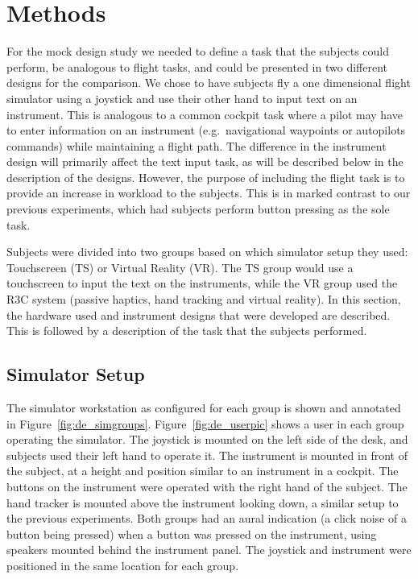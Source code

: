 \section{Methods}

For the mock design study we needed to define a task that the subjects could perform, be analogous to flight tasks, and could be presented in two different designs for the comparison.
We chose to have subjects fly a one dimensional flight simulator using a joystick and use their other hand to input text on an instrument.
This is analogous to a common cockpit task where a pilot may have to enter information on an instrument (e.g.\ navigational waypoints or autopilots commands) while maintaining a flight path.
The difference in the instrument design will primarily affect the text input task, as will be described below in the description of the designs.
However, the purpose of including the flight task is to provide an increase in workload to the subjects.
This is in marked contrast to our previous experiments, which had subjects perform button pressing as the sole task.

Subjects were divided into two groups based on which simulator setup they used: Touchscreen (TS) or Virtual Reality (VR).
The TS group would use a touchscreen to input the text on the instruments, while the VR group used the R3C system (passive haptics, hand tracking and virtual reality).
In this section, the hardware used and instrument designs that were developed are described.
This is followed by a description of the task that the subjects performed.

\subsection{Simulator Setup}

The simulator workstation as configured for each group is shown and annotated in Figure~\ref{fig:de_simgroups}.
Figure~\ref{fig:de_userpic} shows a user in each group operating the simulator.
The joystick is mounted on the left side of the desk, and subjects used their left hand to operate it.
The instrument is mounted in front of the subject, at a height and position similar to an instrument in a cockpit.
The buttons on the instrument were operated with the right hand of the subject.
The hand tracker is mounted above the instrument looking down, a similar setup to the previous experiments.
Both groups had an aural indication (a click noise of a button being pressed) when a button was pressed on the instrument, using speakers mounted behind the instrument panel.
The joystick and instrument were positioned in the same location for each group.

